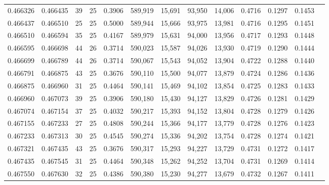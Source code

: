 \begin{tabular}{rrrrrrrrrrrrr}
0.466326 & 0.466435 &    39 &  25 &                                     0.3906 & 589,919 &  15,691 &  93,950 &  14,006 & 0.4716 & 0.1297 & 0.1453 \\
0.466437 & 0.466510 &    25 &  25 &                                     0.5000 & 589,944 &  15,666 &  93,975 &  13,981 & 0.4716 & 0.1295 & 0.1451 \\
0.466510 & 0.466594 &    35 &  25 &                                     0.4167 & 589,979 &  15,631 &  94,000 &  13,956 & 0.4717 & 0.1293 & 0.1448 \\
0.466595 & 0.466698 &    44 &  26 &                                     0.3714 & 590,023 &  15,587 &  94,026 &  13,930 & 0.4719 & 0.1290 & 0.1444 \\
0.466699 & 0.466789 &    44 &  26 &                                     0.3714 & 590,067 &  15,543 &  94,052 &  13,904 & 0.4722 & 0.1288 & 0.1440 \\
0.466791 & 0.466875 &    43 &  25 &                                     0.3676 & 590,110 &  15,500 &  94,077 &  13,879 & 0.4724 & 0.1286 & 0.1436 \\
0.466875 & 0.466960 &    31 &  25 &                                     0.4464 & 590,141 &  15,469 &  94,102 &  13,854 & 0.4725 & 0.1283 & 0.1433 \\
0.466960 & 0.467073 &    39 &  25 &                                     0.3906 & 590,180 &  15,430 &  94,127 &  13,829 & 0.4726 & 0.1281 & 0.1429 \\
0.467074 & 0.467154 &    37 &  25 &                                     0.4032 & 590,217 &  15,393 &  94,152 &  13,804 & 0.4728 & 0.1279 & 0.1426 \\
0.467155 & 0.467233 &    27 &  25 &                                     0.4808 & 590,244 &  15,366 &  94,177 &  13,779 & 0.4728 & 0.1276 & 0.1423 \\
0.467233 & 0.467313 &    30 &  25 &                                     0.4545 & 590,274 &  15,336 &  94,202 &  13,754 & 0.4728 & 0.1274 & 0.1421 \\
0.467321 & 0.467435 &    43 &  25 &                                     0.3676 & 590,317 &  15,293 &  94,227 &  13,729 & 0.4731 & 0.1272 & 0.1417 \\
0.467435 & 0.467545 &    31 &  25 &                                     0.4464 & 590,348 &  15,262 &  94,252 &  13,704 & 0.4731 & 0.1269 & 0.1414 \\
0.467550 & 0.467630 &    32 &  25 &                                     0.4386 & 590,380 &  15,230 &  94,277 &  13,679 & 0.4732 & 0.1267 & 0.1411 \\

\end{tabular}
